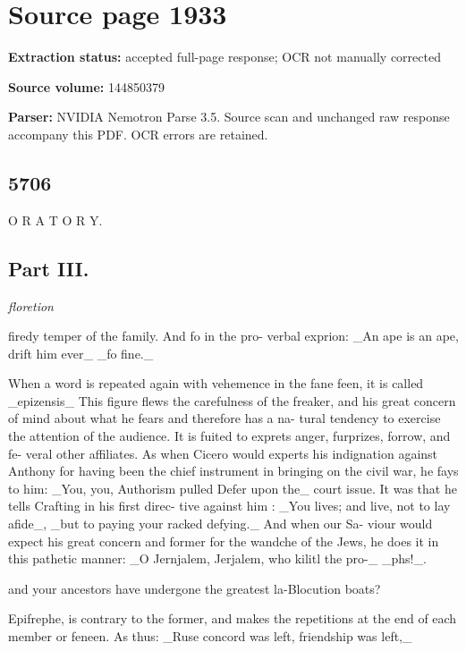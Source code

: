 \clearpage
\section{Source page 1933}
\textbf{Extraction status:} accepted full-page response; OCR not manually corrected\par
\textbf{Source volume:} 144850379\par
\textbf{Parser:} NVIDIA Nemotron Parse 3.5. Source scan and unchanged raw response accompany this PDF. OCR errors are retained.\par\medskip
\subsection*{5706}
O R A T O R Y.\par\medskip
\subsection*{Part III.}
{\small\itshape floretion\par}\medskip
firedy temper of the family. And fo in the pro- verbal exprion: \_An ape is an ape, drift him ever\_
\_fo fine.\_\par\medskip
When a word is repeated again with vehemence in
the fane feen, it is called \_epizensis\_ This figure flews
the carefulness of the freaker, and his great concern
of mind about what he fears and therefore has a na-
tural tendency to exercise the attention of the audience.
It is fuited to exprets anger, furprizes, forrow, and fe-
veral other affiliates. As when Cicero would experts
his indignation against Anthony for having been the
chief instrument in bringing on the civil war, he fays
to him: \_You, you, Authorism pulled Defer upon the\_
court issue. It was that he tells Crafting in his first direc-
tive against him : \_You lives; and live, not to lay afide\_,
\_but to paying your racked defying.\_ And when our Sa-
viour would expect his great concern and former for
the wandche of the Jews, he does it in this pathetic
manner: \_O Jernjalem, Jerjalem, who kilitl the pro-\_
\_phs!\_.\par{}\par{}\par{}\par\medskip
and your ancestors have undergone the greatest la-Blocution
boats?\par\medskip
Epifrephe, is contrary to the former, and makes
the repetitions at the end of each member or feneen.
As thus: \_Ruse concord was left, friendship was left,\_

